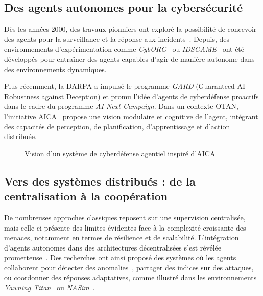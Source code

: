 \documentclass[ twoside,openright,titlepage,numbers=noenddot,headinclude,%
                footinclude=true,cleardoublepage=empty,abstractoff, %
                BCOR=5mm,paper=a4,fontsize=11pt,%
                french,american,%
                ]{scrreprt}
\begin{document}
\subsection*{Des agents autonomes pour la cybersécurité}

Dès les années 2000, des travaux pionniers ont exploré la possibilité de concevoir des agents pour la surveillance et la réponse aux incidents~\cite{Jansen2000}. Depuis, des environnements d'expérimentation comme \emph{CybORG}~\cite{Mature2021} ou \emph{IDSGAME}~\cite{Shamshirband2020} ont été développés pour entraîner des agents capables d'agir de manière autonome dans des environnements dynamiques.

Plus récemment, la DARPA a impulsé le programme \emph{GARD} (Guaranteed AI Robustness against Deception) et promu l'idée d'agents de cyberdéfense proactifs dans le cadre du programme \emph{AI Next Campaign}. Dans un contexte OTAN, l'initiative AICA~\cite{AICAReport2021, AICAGuide2022} propose une vision modulaire et cognitive de l'agent, intégrant des capacités de perception, de planification, d'apprentissage et d'action distribuée.

\begin{figure}[H]
    \centering
    \caption{Vision d'un système de cyberdéfense agentiel inspiré d'AICA}
    \label{fig:agent_architecture}
\end{figure}

\subsection*{Vers des systèmes distribués : de la centralisation à la coopération}

De nombreuses approches classiques reposent sur une supervision centralisée, mais celle-ci présente des limites évidentes face à la complexité croissante des menaces, notamment en termes de résilience et de scalabilité. L'intégration d'agents autonomes dans des architectures décentralisées s'est révélée prometteuse~\cite{Sommer2010, Buczak2016}. Des recherches ont ainsi proposé des systèmes où les agents collaborent pour détecter des anomalies~\cite{Zhang2020, Nguyen2021}, partager des indices sur des attaques, ou coordonner des réponses adaptatives, comme illustré dans les environnements \emph{Yawning Titan}~\cite{Kroese2021} ou \emph{NASim}~\cite{Shetty2021}.
\end{document}
